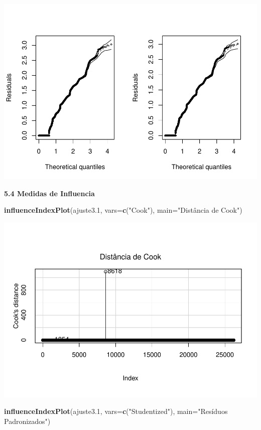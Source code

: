 \documentclass[]{article}
\newenvironment{Shaded}{\begin{snugshade}}{\end{snugshade}}
\newcommand{\KeywordTok}[1]{\textcolor[rgb]{0.13,0.29,0.53}{\textbf{#1}}}
\newcommand{\DataTypeTok}[1]{\textcolor[rgb]{0.13,0.29,0.53}{#1}}
\newcommand{\FloatTok}[1]{\textcolor[rgb]{0.00,0.00,0.81}{#1}}
\newcommand{\StringTok}[1]{\textcolor[rgb]{0.31,0.60,0.02}{#1}}
\newcommand{\NormalTok}[1]{#1}
\begin{document}
\includegraphics{Dados_Binários1_files/figure-latex/unnamed-chunk-16-3.pdf}

\textbf{5.4 Medidas de Influencia}

\begin{Shaded}
\begin{Highlighting}[]
\KeywordTok{influenceIndexPlot}\NormalTok{(ajuste3}\FloatTok{.1}\NormalTok{, }\DataTypeTok{vars=}\KeywordTok{c}\NormalTok{(}\StringTok{"Cook"}\NormalTok{), }\DataTypeTok{main=}\StringTok{"Distância de Cook"}\NormalTok{)}
\end{Highlighting}
\end{Shaded}

\includegraphics{Dados_Binários1_files/figure-latex/unnamed-chunk-17-1.pdf}

\begin{Shaded}
\begin{Highlighting}[]
\KeywordTok{influenceIndexPlot}\NormalTok{(ajuste3}\FloatTok{.1}\NormalTok{, }\DataTypeTok{vars=}\KeywordTok{c}\NormalTok{(}\StringTok{"Studentized"}\NormalTok{), }\DataTypeTok{main=}\StringTok{"Resíduos Padronizados"}\NormalTok{)}
\end{Highlighting}
\end{Shaded}
\end{document}
